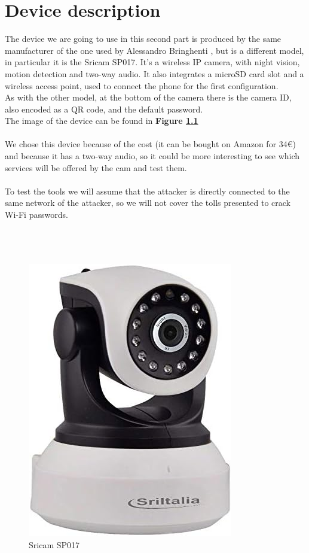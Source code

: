 \chapter{Device description}
The device we are going to use in this second part is produced by the same manufacturer
of the one used by Alessandro Bringhenti \cite{previouswork}, but is a different model, in particular
it is the Sricam SP017. It's a wireless IP camera, with night vision, motion detection
and two-way audio. It also integrates a microSD card slot and a wireless
access point, used to connect the phone for the first configuration.\\
As with the other model, at the bottom of the camera there is the camera ID, also
encoded as a QR code, and the default password.\\
The image of the device can be found in \textbf{Figure \ref{fig:sp017}}\\\\
We chose this device because of the cost (it can be bought on Amazon for 34€) and
because it has a two-way audio, so it could be more interesting to see which services
will be offered by the cam and test them.\\\\
To test the tools we will assume that the attacker is directly connected to the
same network of the attacker, so we will not cover the tolls presented to 
crack Wi-Fi passwords.\\\\\\\\
\begin{figure}[h]
    \centering
    \includegraphics[scale=0.6]{cam.jpg}
    \caption{Sricam SP017}
    \label{fig:sp017}
\end{figure}
\newpage